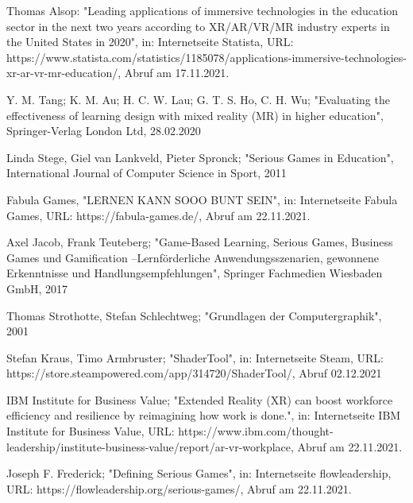 \documentclass[conference]{IEEEtran}
\begin{document}
\begingroup

\begin{thebibliography}{00}
 Thomas Alsop: "Leading applications of immersive technologies in the education sector in the next two years according to XR/AR/VR/MR industry
experts in the United States in 2020", in: Internetseite Statista, URL: https://www.statista.com/statistics/1185078/applications-immersive-technologies-xr-ar-vr-mr-education/, Abruf am 17.11.2021.

\vskip 0.05in
 Y. M. Tang; K. M. Au; H. C. W. Lau; G. T. S. Ho, C. H. Wu; "Evaluating the effectiveness of learning design with mixed reality (MR) in higher education", Springer-Verlag London Ltd, 28.02.2020

\vskip 0.05in
 Linda Stege, Giel van Lankveld, Pieter Spronck; "Serious Games in Education", International Journal of Computer Science in Sport, 2011

\vskip 0.05in
 Fabula Games, "LERNEN KANN SOOO BUNT SEIN", in: Internetseite Fabula Games, URL: https://fabula-games.de/, Abruf am 22.11.2021.

\vskip 0.05in
 Axel Jacob, Frank Teuteberg; "Game-Based Learning, Serious Games, Business Games und Gamification –Lernförderliche Anwendungsszenarien, gewonnene Erkenntnisse und Handlungsempfehlungen", Springer Fachmedien Wiesbaden GmbH, 2017

\vskip 0.05in
 Thomas Strothotte, Stefan Schlechtweg; "Grundlagen der Computergraphik", 2001

\vskip 0.05in
 Stefan Kraus, Timo Armbruster; "ShaderTool", in: Internetseite Steam, URL: https://store.steampowered.com/app/314720/ShaderTool/, Abruf 02.12.2021

\vskip 0.05in
 IBM Institute for Business Value; "Extended Reality (XR) can boost workforce efficiency and resilience by reimagining how work is done.", in: Internetseite IBM Institute for Business Value, URL: https://www.ibm.com/thought-leadership/institute-business-value/report/ar-vr-workplace, Abruf am 22.11.2021.

\vskip 0.05in
 Joseph F. Frederick; "Defining Serious Games", in: Internetseite flowleadership, URL: https://flowleadership.org/serious-games/, Abruf am 22.11.2021.


\end{thebibliography}
\end{document}
